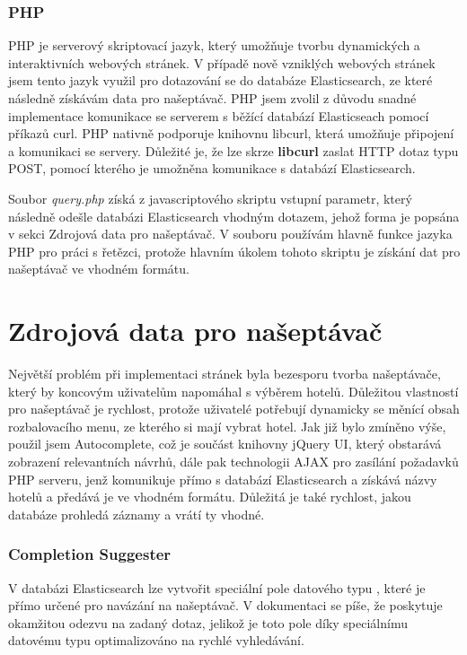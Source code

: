 \documentclass[czech,BP]{thesiskiv}
\begin{document}
\subsubsection{PHP}
PHP je serverový skriptovací jazyk, který umožňuje tvorbu dynamických a interaktivních webových stránek.\cite{PHP} V případě nově vzniklých webových stránek jsem tento jazyk využil pro dotazování se do databáze Elasticsearch, ze které následně získávám data pro našeptávač. PHP jsem zvolil z důvodu snadné implementace komunikace se serverem s běžící databází Elasticseach pomocí příkazů curl. PHP nativně podporuje knihovnu libcurl, která umožňuje připojení a komunikaci se servery.\cite{PHP_libcurl} Důležité je, že lze skrze \textbf{libcurl} zaslat HTTP dotaz typu POST, pomocí kterého je umožněna komunikace s databází Elasticsearch.


Soubor \textit{query.php} získá z javascriptového skriptu vstupní parametr, který následně odešle databázi Elasticsearch vhodným dotazem, jehož forma je popsána v sekci Zdrojová data pro našeptávač. V souboru používám hlavně funkce jazyka PHP pro  práci s řetězci, protože hlavním úkolem tohoto skriptu je získání dat pro našeptávač ve vhodném formátu.

\section{Zdrojová data pro našeptávač}
Největší problém při implementaci stránek byla bezesporu tvorba našeptávače, který by koncovým uživatelům napomáhal s výběrem hotelů. Důležitou vlastností pro našeptávač je rychlost, protože uživatelé potřebují dynamicky se měnící obsah rozbalovacího menu, ze kterého si mají vybrat hotel. Jak již bylo zmíněno výše, použil jsem Autocomplete, což je součást knihovny jQuery UI, který obstarává zobrazení relevantních návrhů, dále pak technologii AJAX pro zasílání požadavků PHP serveru, jenž komunikuje přímo s databází Elasticsearch a získává názvy hotelů a předává je ve vhodném formátu. Důležitá je také rychlost, jakou databáze prohledá záznamy a vrátí ty vhodné.

\subsubsection{Completion Suggester}
V databázi Elasticsearch lze vytvořit speciální pole datového typu , které je přímo určené pro navázání na našeptávač. V dokumentaci se píše, že poskytuje okamžitou odezvu na zadaný dotaz, jelikož je toto pole díky speciálnímu datovému typu optimalizováno na rychlé vyhledávání.\cite{Completion_suggester}
\end{document}
